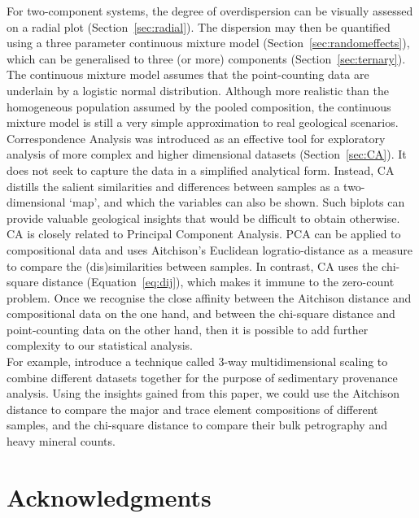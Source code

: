 \documentclass{article}
\begin{document}
For two-component systems, the degree of overdispersion can be
visually assessed on a radial plot (Section~\ref{sec:radial}). The
dispersion may then be quantified using a three parameter continuous
mixture model (Section~\ref{sec:randomeffects}), which can be
generalised to three (or more) components
(Section~\ref{sec:ternary}). The continuous mixture model assumes that
the point-counting data are underlain by a logistic normal
distribution.  Although more realistic than the homogeneous population
assumed by the pooled composition, the continuous mixture model is
still a very simple approximation to real geological scenarios.\\

Correspondence Analysis was introduced as an effective tool for
exploratory analysis of more complex and higher dimensional datasets
(Section~\ref{sec:CA}).  It does not seek to capture the data in a
simplified analytical form.  Instead, CA distills the salient
similarities and differences between samples as a two-dimensional
`map', and which the variables can also be shown. Such biplots can
provide valuable geological insights that would be difficult to obtain
otherwise.\\

CA is closely related to Principal Component Analysis. PCA can be
applied to compositional data and uses Aitchison's Euclidean
logratio-distance as a measure to compare the (dis)similarities
between samples.  In contrast, CA uses the chi-square distance
(Equation~\ref{eq:dij}), which makes it immune to the zero-count
problem. Once we recognise the close affinity between the Aitchison
distance and compositional data on the one hand, and between the
chi-square distance and point-counting data on the other hand, then it
is possible to add further complexity to our statistical analysis.\\

For example, \citet{vermeesch2015} introduce a technique called 3-way
multidimensional scaling to combine different datasets together for
the purpose of sedimentary provenance analysis. Using the insights
gained from this paper, we could use the Aitchison distance to compare
the major and trace element compositions of different samples, and the
chi-square distance to compare their bulk petrography and heavy
mineral counts.

\section*{Acknowledgments}
\end{document}
